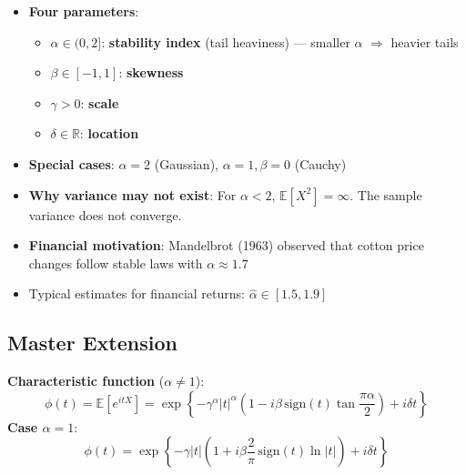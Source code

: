 \documentclass[11pt, a4paper]{article}
\newcommand{\E}{\mathbb{E}}
\newcommand{\R}{\mathbb{R}}
\theoremstyle{definition}
\begin{document}
\begin{itemize}
  \item \textbf{Four parameters}:
  \begin{itemize}
    \item $\alpha \in (0, 2]$: \textbf{stability index} (tail heaviness) — smaller $\alpha$ $\Rightarrow$ heavier tails
    \item $\beta \in [-1, 1]$: \textbf{skewness}
    \item $\gamma > 0$: \textbf{scale}
    \item $\delta \in \R$: \textbf{location}
  \end{itemize}
  \item \textbf{Special cases}: $\alpha = 2$ (Gaussian), $\alpha = 1, \beta = 0$ (Cauchy)
  \item \textbf{Why variance may not exist}: For $\alpha < 2$, $\E[X^2] = \infty$. The sample variance does not converge.
  \item \textbf{Financial motivation}: Mandelbrot (1963) observed that cotton price changes follow stable laws with $\alpha \approx 1.7$
  \item Typical estimates for financial returns: $\hat{\alpha} \in [1.5, 1.9]$
\end{itemize}

\subsection{Master Extension}

\noindent\textbf{Characteristic function} ($\alpha \neq 1$):
\[
  \phi(t) = \E[e^{itX}] = \exp\!\left\{-\gamma^\alpha |t|^\alpha\!\left(1 - i\beta\,\text{sign}(t)\tan\frac{\pi\alpha}{2}\right) + i\delta t\right\}
\]
\textbf{Case $\alpha = 1$}:
\[
  \phi(t) = \exp\!\left\{-\gamma|t|\!\left(1 + i\beta\frac{2}{\pi}\,\text{sign}(t)\ln|t|\right) + i\delta t\right\}
\]
\end{document}
